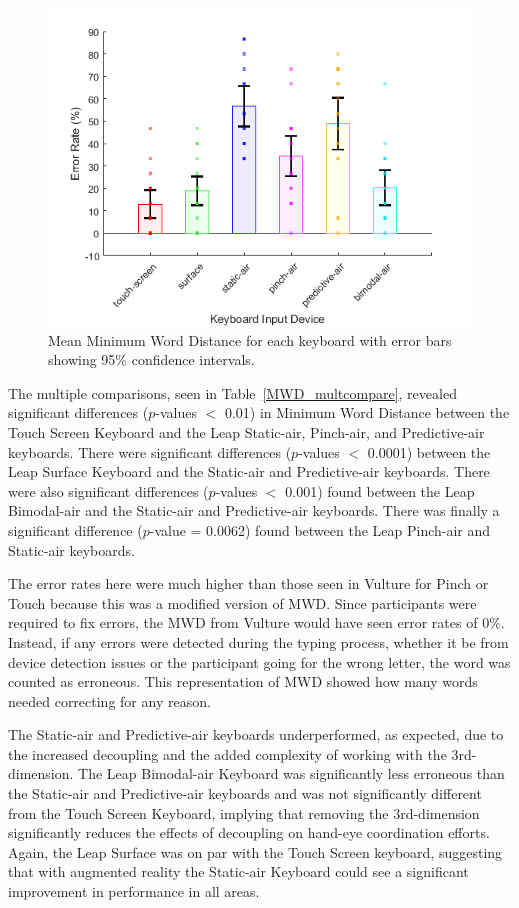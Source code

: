 \begin{figure}[!t]
	\centering
	\includegraphics{Figures/fig_MWD_mean}
	\caption[Mean Minimum Word Distance]{Mean Minimum Word Distance for each keyboard with error bars showing 95\% confidence intervals.}
	\label{fig_MWD_mean}
\end{figure}

The multiple comparisons, seen in Table~\ref{MWD_multcompare}, revealed significant differences ($p$-values $<$ 0.01) in Minimum Word Distance between the Touch Screen Keyboard and the Leap Static-air, Pinch-air, and Predictive-air keyboards. There were significant differences ($p$-values $<$ 0.0001) between the Leap Surface Keyboard and the Static-air and Predictive-air keyboards. There were also significant differences ($p$-values $<$ 0.001) found between the Leap Bimodal-air and the Static-air and Predictive-air keyboards. There was finally a significant difference ($p$-value = 0.0062) found between the Leap Pinch-air and Static-air keyboards.

The error rates here were much higher than those seen in Vulture for Pinch or Touch \cite{ref_vulture} because this was a modified version of MWD. Since participants were required to fix errors, the MWD from Vulture would have seen error rates of 0\%. Instead, if any errors were detected during the typing process, whether it be from device detection issues or the participant going for the wrong letter, the word was counted as erroneous. This representation of MWD showed how many words needed correcting for any reason.

The Static-air and Predictive-air keyboards underperformed, as expected, due to the increased decoupling and the added complexity of working with the 3rd-dimension. The Leap Bimodal-air Keyboard was significantly less erroneous than the Static-air and Predictive-air keyboards and was not significantly different from the Touch Screen Keyboard, implying that removing the 3rd-dimension significantly reduces the effects of decoupling on hand-eye coordination efforts. Again, the Leap Surface was on par with the Touch Screen keyboard, suggesting that with augmented reality the Static-air Keyboard could see a significant improvement in performance in all areas.

